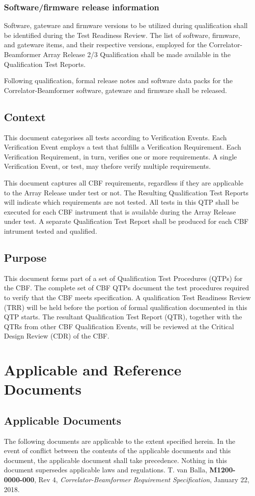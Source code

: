 \subsection{Software/firmware release information}
Software, gateware and firmware versions to be utilized during qualification shall be identified during the Test Readiness Review. The list of software, firmware, and gateware items, and their respective versions, employed for the Correlator-Beamformer Array Release 2/3 Qualification shall be made available in the Qualification Test Reports.

Following qualification, formal release notes and software data packs for the Correlator-Beamformer software, gateware and firmware shall be released.
\section{Context}
This document categorises all tests according to Verification Events. Each Verification Event employs a test that fulfills a Verification Requirement. Each Verification Requirement, in turn, verifies one or more requirements. A single Verification Event, or test, may thefore verify multiple requirements.

This document captures all CBF requirements, regardless if they are applicable to the Array Release under test or not. The Resulting Qualification Test Reports will indicate which requirements are not tested. All tests in this QTP shall be executed for each CBF instrument that is available during the Array Release under test. A separate Qualification Test Report shall be produced for each CBF intrument tested and qualified.
\section{Purpose}
This document forms part of a set of Qualification Test Procedures (QTPs) for the CBF. The complete set of CBF QTPs document the test procedures required to verify that the CBF meets specification.
A qualification Test Readiness Review (TRR) will be held before the portion of formal qualification documented in this QTP starts.
The resultant Qualification Test Report (QTR), together with the QTRs from other CBF Qualification Events, will be reviewed at the Critical Design Review (CDR) of the CBF.
\chapter{Applicable and Reference Documents}
\section{Applicable Documents}
The following documents are applicable to the extent specified herein. In the event of conflict between the contents of the applicable documents and this document, the applicable document shall take precedence.  Nothing in this document supersedes applicable laws and regulations.
\newline\newline
[1]\hspace{10mm} T. van Balla, {\bf M1200-0000-000}, Rev 4, {\it Correlator-Beamformer Requirement Specification}, January 22, 2018.
